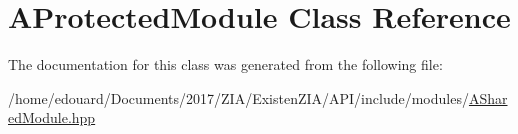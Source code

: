 \hypertarget{classAProtectedModule}{}\section{A\+Protected\+Module Class Reference}
\label{classAProtectedModule}


The documentation for this class was generated from the following file\+:\begin{DoxyCompactItemize}
\item 
/home/edouard/\+Documents/2017/\+Z\+I\+A/\+Existen\+Z\+I\+A/\+A\+P\+I/include/modules/\mbox{\hyperlink{ASharedModule_8hpp}{A\+Shared\+Module.\+hpp}}\end{DoxyCompactItemize}
